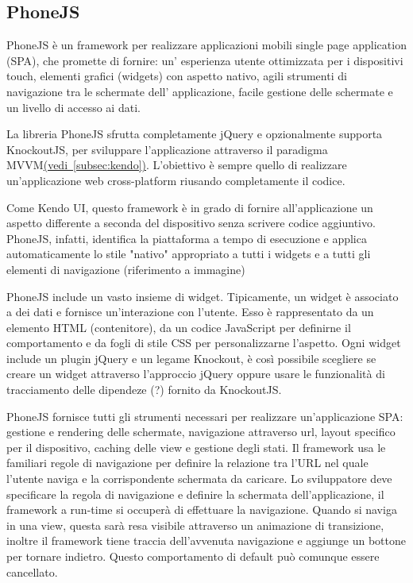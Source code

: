 		\subsection{PhoneJS}
			PhoneJS è un framework per realizzare applicazioni mobili 
			single page application (SPA), che promette di fornire: un'
			esperienza utente ottimizzata per i dispositivi touch, elementi 
			grafici (widgets) con 
			aspetto nativo, agili strumenti di navigazione tra le schermate dell'
			applicazione, facile gestione delle schermate e un livello di accesso 
			ai dati.
			
			La libreria PhoneJS sfrutta completamente jQuery e opzionalmente 
			supporta KnockoutJS, per sviluppare l'applicazione attraverso il paradigma 
			MVVM\hyperref[subsec:kendo]{(vedi~\ref{subsec:kendo})}.
			L'obiettivo è sempre quello di realizzare un'applicazione web cross-platform 
			riusando completamente il codice.
			
			Come Kendo UI, questo framework è in grado di fornire all'applicazione 
			un aspetto differente a seconda del dispositivo senza scrivere codice aggiuntivo.
			PhoneJS, infatti, identifica la piattaforma a tempo di esecuzione 
			e applica automaticamente 
			lo stile "nativo" appropriato a tutti i widgets e a tutti gli elementi 
			di navigazione (riferimento a immagine)
			
			PhoneJS include un vasto insieme di widget. Tipicamente, 
			un widget è associato a dei dati e fornisce un'interazione con l'utente.
			Esso è rappresentato da un elemento HTML (contenitore), da un codice 
			JavaScript per definirne il comportamento e da fogli di stile CSS 
			per personalizzarne l'aspetto. 
			Ogni widget include un plugin jQuery e un legame Knockout, è così 
			possibile scegliere se creare un widget attraverso l'approccio jQuery 
			oppure usare le funzionalità di tracciamento delle dipendeze (?) fornito 
			da KnockoutJS. 
			
			PhoneJS fornisce tutti gli strumenti necessari per realizzare un'applicazione 
			SPA: gestione e rendering delle schermate, navigazione attraverso url, 
			layout specifico per il dispositivo, caching delle view e gestione degli stati.
			Il framework usa le familiari regole di navigazione per definire la 
			relazione tra l'URL nel quale l'utente naviga e la corrispondente schermata 
			da caricare. Lo sviluppatore deve specificare la regola di navigazione e definire 
			la schermata dell'applicazione, il framework a run-time si occuperà di effettuare la 
			navigazione.
			Quando si naviga in una view, questa sarà resa visibile attraverso un 
			animazione di transizione, inoltre il framework tiene traccia dell'avvenuta 
			navigazione e aggiunge un bottone per tornare indietro. Questo comportamento 
			di default può comunque essere cancellato.
			
